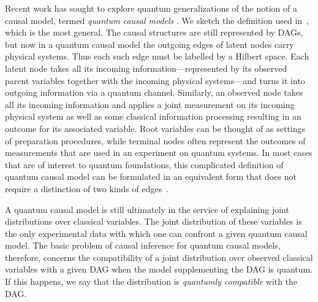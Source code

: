 {%

Recent work has sought to explore quantum generalizations of the notion of a causal model, termed {\em quantum causal models} \cite{pusey2014gdag,BeyondBellII,Chaves2015infoquantum}. We sketch the definition used in~\cite{pusey2014gdag}, which is the most general. The causal structures are still represented by DAGs, but now in a quantum causal model the outgoing edges of latent nodes carry physical systems. Thus each such edge must be labelled by a Hilbert space. Each latent node takes all its incoming information---represented by its observed parent variables together with the incoming physical systems---and turns it into outgoing information via a quantum channel. Similarly, an observed node takes all its incoming information and applies a joint measurement on its incoming physical system as well as some classical information processing resulting in an outcome for its associated variable. Root variables can be thought of as settings of preparation procedures, while terminal nodes often represent the outcomes of measurements that are used in an experiment on quantum systems. In most cases that are of interest to quantum foundations, this complicated definition of quantum causal model can be formulated in an equivalent form that does not require a distinction of two kinds of edges~\cite{BeyondBellII}.

A quantum causal model is still ultimately in the service of explaining joint distributions over classical variables. The joint distribution of these variables is the only experimental data with which one can confront a given quantum causal model. The basic problem of causal inference for quantum causal models, therefore, concerns the compatibility of a joint distribution over observed classical variables with a given DAG when the model supplementing the DAG is quantum. If this happens, we say that the distribution is {\em quantumly compatible} with the DAG.  
 

}
